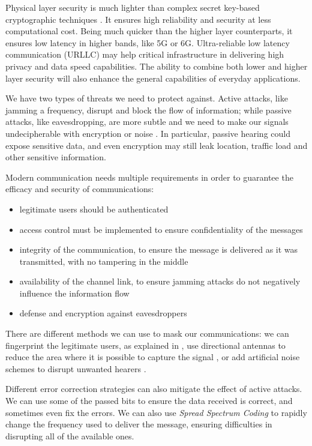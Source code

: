 Physical layer security is much lighter than complex secret key-based cryptographic techniques \cite{10599431}. It ensures high reliability and security at less computational cost. Being much quicker than the higher layer counterparts, it ensures low latency in higher bands, like 5G or 6G. Ultra-reliable low latency communication (URLLC) may help critical infrastructure in delivering high privacy and data speed capabilities. The ability to combine both lower and higher layer security will also enhance the general capabilities of everyday applications.

We have two types of threats we need to protect against. Active attacks, like jamming a frequency, disrupt and block the flow of information; while passive attacks, like eavesdropping, are more subtle and we need to make our signals undecipherable with encryption or noise \cite{5751298}. In particular, passive hearing could expose sensitive data, and even encryption may still leak location, traffic load and other sensitive information.

Modern communication needs multiple requirements in order to guarantee the efficacy and security of communications:
\begin{itemize}
  \item legitimate users should be authenticated
  \item access control must be implemented to ensure confidentiality of the messages
  \item integrity of the communication, to ensure the message is delivered as it was transmitted, with no tampering in the middle
  \item availability of the channel link, to ensure jamming attacks do not negatively influence the information flow
  \item defense and encryption against eavesdroppers
\end{itemize}

There are different methods we can use to mask our communications: we can fingerprint the legitimate users, as explained in \cite{228fe14543ce4cefba3bb9cc11741362}, use directional antennas to reduce the area where it is possible to capture the signal \cite{4543070}, or add artificial noise schemes to disrupt unwanted hearers \cite{1605889}.

Different error correction strategies can also mitigate the effect of active attacks. We can use some of the passed bits to ensure the data received is correct, and sometimes even fix the errors. We can also use \textit{Spread Spectrum Coding} to rapidly change the frequency used to deliver the message, ensuring difficulties in disrupting all of the available ones.

